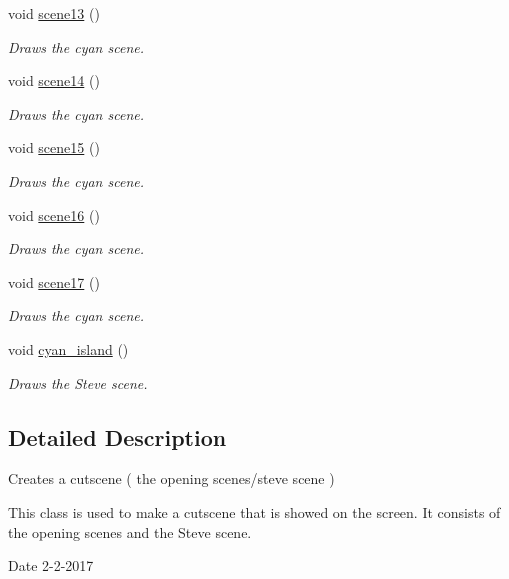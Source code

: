 \begin{DoxyCompactItemize}
void \hyperlink{classcutscene1_a70656ea0e35919324bff0a85f81a5a92}{scene13} ()
\begin{DoxyCompactList}\small\item\em Draws the cyan scene. \end{DoxyCompactList}\item 
void \hyperlink{classcutscene1_ad361d93d7c2c69c96bece8449221ac41}{scene14} ()
\begin{DoxyCompactList}\small\item\em Draws the cyan scene. \end{DoxyCompactList}\item 
void \hyperlink{classcutscene1_a2e175a494e93ec627d314f6372a6578c}{scene15} ()
\begin{DoxyCompactList}\small\item\em Draws the cyan scene. \end{DoxyCompactList}\item 
void \hyperlink{classcutscene1_a4a414fd614b2d835107d9d8713d1e539}{scene16} ()
\begin{DoxyCompactList}\small\item\em Draws the cyan scene. \end{DoxyCompactList}\item 
void \hyperlink{classcutscene1_a9706ac15030f2831ecf326894a5031c5}{scene17} ()
\begin{DoxyCompactList}\small\item\em Draws the cyan scene. \end{DoxyCompactList}\item 
void \hyperlink{classcutscene1_a23a6a1aa9b24d60b5362e958e724c465}{cyan\+\_\+island} ()
\begin{DoxyCompactList}\small\item\em Draws the Steve scene. \end{DoxyCompactList}\end{DoxyCompactItemize}


\subsection{Detailed Description}
Creates a cutscene ( the opening scenes/steve scene ) 

This class is used to make a cutscene that is showed on the screen. It consists of the opening scenes and the Steve scene.

\begin{DoxyDate}{Date}
2-\/2-\/2017 
\end{DoxyDate}


